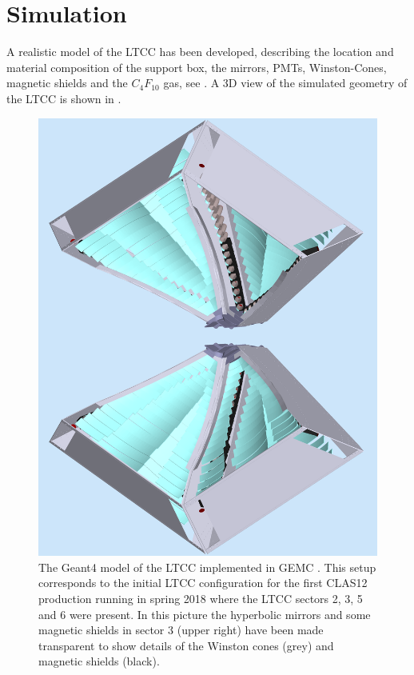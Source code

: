 \section{Simulation}

A realistic model of the LTCC has been developed, describing the location and material composition
of the support box, the mirrors, PMTs, Winston-Cones, magnetic shields and the $C_4F_{10}$ gas, see \cite{gemc2019}.
A 3D view of the simulated geometry of the LTCC is shown in .


\begin{figure}
	\centering
	\includegraphics[width=0.99\columnwidth,keepaspectratio]{img/simOverview.png}
	\caption{The Geant4 model of the LTCC implemented in GEMC \cite{gemc2019}. This setup corresponds to the
             initial LTCC configuration for the first CLAS12 production running in spring 2018
			 where the LTCC sectors 2, 3, 5 and 6 were present. In this picture the hyperbolic mirrors and some magnetic shields
             in sector 3 (upper right) have been made transparent to show details of the Winston cones (grey) and magnetic shields (black).}
	\label{fig:simOverview}
\end{figure}


